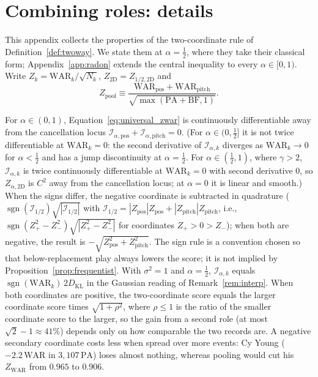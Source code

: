 \documentclass[11pt,letterpaper]{article}
\theoremstyle{plain}
\theoremstyle{definition}
\theoremstyle{remark}
\newcommand{\WAR}{\mathrm{WAR}}
\newcommand{\PA}{\mathrm{PA}}
\newcommand{\BF}{\mathrm{BF}}
\newcommand{\ZWAR}{Z_{\WAR}}
\newcommand{\Zpos}{Z_{\mathrm{pos}}}
\newcommand{\Zpitch}{Z_{\mathrm{pitch}}}
\newcommand{\Zpool}{Z_{\mathrm{pool}}}
\newcommand{\Ztwoway}{Z_{\mathrm{2D}}}
\newcommand{\DKL}{D_{\mathrm{KL}}}
\newcommand{\sgn}{\operatorname{sgn}}
\newcommand{\Ical}{\mathcal{I}}
\begin{document}
\section{Combining roles: details}
\label{app:twoway}

This appendix collects the properties of the two-coordinate rule of Definition~\ref{def:twoway}. We state them at $\alpha = \tfrac12$, where they take their classical form; Appendix~\ref{app:radon} extends the central inequality to every $\alpha \in [0,1)$. Write $Z_k = \WAR_k/\sqrt{N_k}$, $\Ztwoway = Z_{1/2,\mathrm{2D}}$ and
\begin{equation}
    \Zpool \equiv \frac{\WAR_{\mathrm{pos}} + \WAR_{\mathrm{pitch}}}{\sqrt{\max(\PA + \BF, 1)}}.
\end{equation}

For $\alpha \in (0, 1)$, Equation~\eqref{eq:universal_zwar} is continuously differentiable away from the cancellation locus $\Ical_{\alpha,\mathrm{pos}} + \Ical_{\alpha,\mathrm{pitch}} = 0$. (For $\alpha \in (0, \tfrac12]$ it is not twice differentiable at $\WAR_k = 0$: the second derivative of $\Ical_{\alpha,k}$ diverges as $\WAR_k \to 0$ for $\alpha < \tfrac12$ and has a jump discontinuity at $\alpha = \tfrac12$. For $\alpha \in (\tfrac12, 1)$, where $\gamma > 2$, $\Ical_{\alpha,k}$ is twice continuously differentiable at $\WAR_k = 0$ with second derivative $0$, so $Z_{\alpha,\mathrm{2D}}$ is $C^2$ away from the cancellation locus; at $\alpha = 0$ it is linear and smooth.) When the signs differ, the negative coordinate is subtracted in quadrature ($\sgn(\Ical_{1/2})\sqrt{|\Ical_{1/2}|}$ with $\Ical_{1/2} = |\Zpos|\Zpos + |\Zpitch|\Zpitch$, i.e., $\sgn(Z_+^2 - Z_-^2)\sqrt{|Z_+^2 - Z_-^2|}$ for coordinates $Z_+ > 0 > Z_-$); when both are negative, the result is $-\sqrt{\Zpos^2 + \Zpitch^2}$. The sign rule is a convention chosen so that below-replacement play always lowers the score; it is not implied by Proposition~\ref{prop:frequentist}. With $\sigma^2 = 1$ and $\alpha = \tfrac12$, $\Ical_{\alpha,k}$ equals $\sgn(\WAR_k)\,2\DKL$ in the Gaussian reading of Remark~\ref{rem:interp}. When both coordinates are positive, the two-coordinate score equals the larger coordinate score times $\sqrt{1+\rho^2}$, where $\rho \le 1$ is the ratio of the smaller coordinate score to the larger, so the gain from a second role (at most $\sqrt2 - 1 \approx 41\%$) depends only on how comparable the two records are. A negative secondary coordinate costs less when spread over more events: Cy Young ($-2.2\,\WAR$ in $3{,}107\,\PA$) loses almost nothing, whereas pooling would cut his $\ZWAR$ from $0.965$ to $0.906$.
\end{document}
